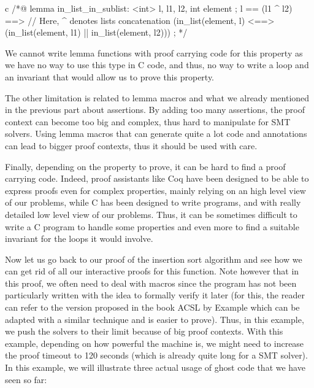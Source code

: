 \begin{CodeBlock}{c}
/*@
  lemma in_list_in_sublist:
    \forall \list<int> l, l1, l2, int element ;
      l == (l1 ^ l2) ==>      // Here, ^ denotes lists concatenation
      (in_list(element, l) <==> (in_list(element, l1) || in_list(element, l2))) ;
*/
\end{CodeBlock}

We cannot write lemma functions with proof carrying code for this property as
we have no way to use this type in C code, and thus, no way to write a loop and
an invariant that would allow us to prove this property.


The other limitation is related to lemma macros and what we already mentioned
in the previous part about assertions. By adding too many assertions, the proof
context can become too big and complex, thus hard to manipulate for SMT
solvers. Using lemma macros that can generate quite a lot code and annotations
can lead to bigger proof contexts, thus it should be used with care.


Finally, depending on the property to prove, it can be hard to find a proof
carrying code. Indeed, proof assistants like Coq have been designed to be able
to express proofs even for complex properties, mainly relying on an high level
view of our problems, while C has been designed to write programs, and with
really detailed low level view of our problems. Thus, it can be sometimes
difficult to write a C program to handle some properties and even more to find
a suitable invariant for the loops it would involve.





Now let us go back to our proof of the insertion sort algorithm and see how we
can get rid of all our interactive proofs for this function. Note however that
in this proof, we often need to deal with macros since the program has not been
particularly written with the idea to formally verify it later (for this, the
reader can refer to the version proposed in the book ACSL by Example which can
be adapted with a similar technique and is easier to prove). Thus, in
this example, we push the solvers to their limit because of big proof contexts.
With this example, depending on how powerful the machine is, we might need to
increase the proof timeout to 120 seconds (which is already quite long for a
SMT solver). In this example, we will illustrate three actual usage of ghost
code that we have seen so far:


